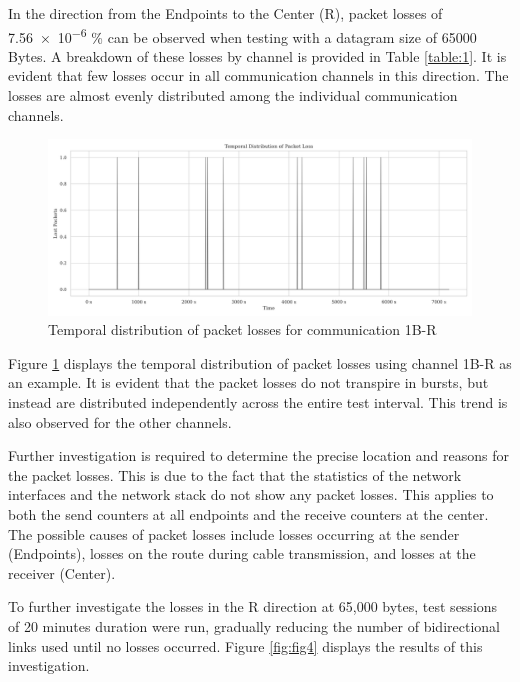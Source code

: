 \documentclass[11pt]{article}
\begin{document}
In the direction from the Endpoints to the Center (R), packet losses of \num{7.56e-6} \% can be observed when testing with a datagram size of 65000 Bytes. A breakdown of these losses by channel is provided in Table \ref{table:1}. It is evident that few losses occur in all communication channels in this direction. The losses are almost evenly distributed among the individual communication channels.

\begin{figure}[h]
	\includegraphics[width=\textwidth]{fig3.png}
	\centering
	\caption{Temporal distribution of packet losses for communication 1B-R}
    \label{fig:fig3}
\end{figure}

Figure \ref{fig:fig3} displays the temporal distribution of packet losses using channel 1B-R as an example. It is evident that the packet losses do not transpire in bursts, but instead are distributed independently across the entire test interval. This trend is also observed for the other channels.

Further investigation is required to determine the precise location and reasons for the packet losses. This is due to the fact that the statistics of the network interfaces and the network stack do not show any packet losses. This applies to both the send counters at all endpoints and the receive counters at the center. The possible causes of packet losses include losses occurring at the sender (Endpoints), losses on the route during cable transmission, and losses at the receiver (Center).

To further investigate the losses in the R direction at 65,000 bytes, test sessions of 20 minutes duration were run, gradually reducing the number of bidirectional links used until no losses occurred. Figure \ref{fig:fig4} displays the results of this investigation.
\end{document}
